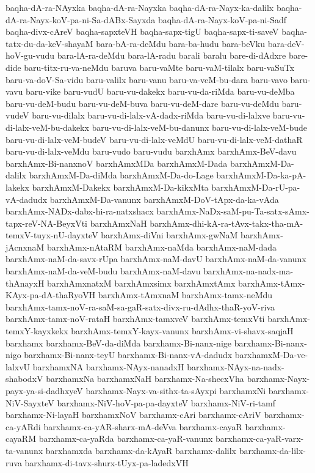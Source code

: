 {baqha-dA-ra-NAyxka
baqha-dA-ra-Nayxka
baqha-dA-ra-Nayx-ka-dalilx
baqha-dA-ra-Nayx-koV-pa-ni-Sa-dABx-Sayxda
baqha-dA-ra-Nayx-koV-pa-ni-Sadf
baqha-divx-cAreV
baqha-sapxteVH
baqha-sapx-tigU
baqha-sapx-ti-saveV
baqha-tatx-du-da-keV-shayaM
bara-bA-ra-deMdu
bara-ba-hudu
bara-beVku
bara-deV-hoV-gu-vudu
bara-lA-ra-deMdu
bara-lA-radu
barali
baralu
bare-di-dAdxre
bare-dide
baru-titx-ru-va-neMdu
baruva
baru-vaMte
baru-vaM-tilalx
baru-vaSuTx
baru-va-doV-Sa-vidu
baru-valilx
baru-vanu
baru-va-veM-bu-dara
baru-vavo
baru-vavu
baru-vike
baru-vudU
baru-vu-dakekx
baru-vu-da-riMda
baru-vu-deMba
baru-vu-deM-budu
baru-vu-deM-buva
baru-vu-deM-dare
baru-vu-deMdu
baru-vudeV
baru-vu-dilalx
baru-vu-di-lalx-vA-dadx-riMda
baru-vu-di-lalxve
baru-vu-di-lalx-veM-bu-dakekx
baru-vu-di-lalx-veM-bu-danunx
baru-vu-di-lalx-veM-bude
baru-vu-di-lalx-veM-budeV
baru-vu-di-lalx-veMdU
baru-vu-di-lalx-veM-dathaR
baru-vu-di-lalx-veMdu
baru-vudo
baru-vudu
barxhAmx
barxhAmx-BeV-davu
barxhAmx-Bi-nanxnoV
barxhAmxMDa
barxhAmxM-Dada
barxhAmxM-Da-dalilx
barxhAmxM-Da-diMda
barxhAmxM-Da-do-Lage
barxhAmxM-Da-ka-pA-lakekx
barxhAmxM-Dakekx
barxhAmxM-Da-kikxMta
barxhAmxM-Da-rU-pa-vA-dadudx
barxhAmxM-Da-vanunx
barxhAmxM-DoV-tApx-da-ka-vAda
barxhAmx-NADx-dabx-hi-ra-natxshacx
barxhAmx-NaDx-saM-pu-Ta-satx-sAmx-tapx-reV-NA-BeyxVti
barxhAmxNaH
barxhAmx-dhi-kA-ra-tAvx-takx-tha-mA-temxV-tuyx-nU-dayxteV
barxhAmx-diVni
barxhAmx-gwNaM
barxhAmx-jAcnxnaM
barxhAmx-nAtaRM
barxhAmx-naMda
barxhAmx-naM-dada
barxhAmx-naM-da-savx-rUpa
barxhAmx-naM-davU
barxhAmx-naM-da-vanunx
barxhAmx-naM-da-veM-budu
barxhAmx-naM-davu
barxhAmx-na-nadx-ma-thAnayxH
barxhAmxnatxM
barxhAmxsimx
barxhAmxtAmx
barxhAmx-tAmx-KAyx-pa-dA-thaRyoVH
barxhAmx-tAmxnaM
barxhAmx-tamx-neMdu
barxhAmx-tamx-noV-ra-saM-sa-gaR-satx-divx-ru-dAdhx-thaR-yoV-riva
barxhAmx-tamx-noV-rataH
barxhAmx-tamxveV
barxhAmx-temxVti
barxhAmx-temxY-kayxkekx
barxhAmx-temxY-kayx-vanunx
barxhAmx-vi-shavx-saqjaH
barxhamx
barxhamx-BeV-da-diMda
barxhamx-Bi-nanx-nige
barxhamx-Bi-nanx-nigo
barxhamx-Bi-nanx-teyU
barxhamx-Bi-nanx-vA-dadudx
barxhamxM-Da-ve-lalxvU
barxhamxNA
barxhamx-NAyx-nanadxH
barxhamx-NAyx-na-nadx-shabodxV
barxhamxNa
barxhamxNaH
barxhamx-Na-shecxVha
barxhamx-Nayx-payx-ya-si-dadhxyeV
barxhamx-Nayx-va-sithx-ta-sAyxpi
barxhamxNi
barxhamx-NiV-SayxteV
barxhamx-NiV-hoV-pa-pa-dayxteV
barxhamx-NiV-ri-tamf
barxhamx-Ni-layaH
barxhamxNoV
barxhamx-cAri
barxhamx-cAriV
barxhamx-ca-yARdi
barxhamx-ca-yAR-sharx-mA-deVva
barxhamx-cayaR
barxhamx-cayaRM
barxhamx-ca-yaRda
barxhamx-ca-yaR-vanunx
barxhamx-ca-yaR-varx-ta-vanunx
barxhamxda
barxhamx-da-kAyaR
barxhamx-dalilx
barxhamx-da-lilx-ruva
barxhamx-di-tavx-shurx-tUyx-pa-ladedxVH
}
